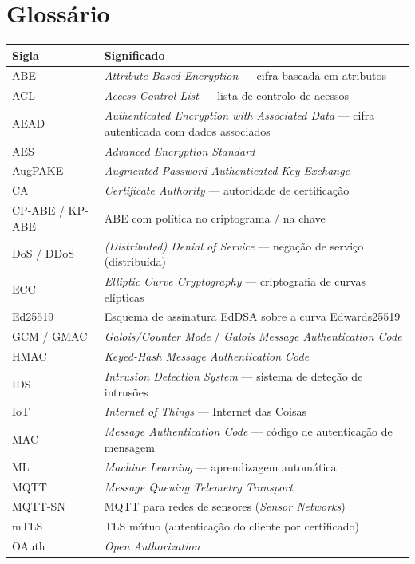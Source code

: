 \section*{Glossário}

\begin{longtable}{@{}L{2.6cm}L{12.2cm}@{}}
\toprule
\textbf{Sigla} & \textbf{Significado} \\
\midrule
\endhead
ABE    & \emph{Attribute-Based Encryption} --- cifra baseada em atributos \\
ACL    & \emph{Access Control List} --- lista de controlo de acessos \\
AEAD   & \emph{Authenticated Encryption with Associated Data} --- cifra autenticada com dados associados \\
AES    & \emph{Advanced Encryption Standard} \\
AugPAKE & \emph{Augmented Password-Authenticated Key Exchange} \\
CA     & \emph{Certificate Authority} --- autoridade de certificação \\
CP-ABE / KP-ABE & ABE com política no criptograma / na chave \\
DoS / DDoS & \emph{(Distributed) Denial of Service} --- negação de serviço (distribuída) \\
ECC    & \emph{Elliptic Curve Cryptography} --- criptografia de curvas elípticas \\
Ed25519 & Esquema de assinatura EdDSA sobre a curva Edwards25519 \\
GCM / GMAC & \emph{Galois/Counter Mode} / \emph{Galois Message Authentication Code} \\
HMAC   & \emph{Keyed-Hash Message Authentication Code} \\
IDS    & \emph{Intrusion Detection System} --- sistema de deteção de intrusões \\
IoT    & \emph{Internet of Things} --- Internet das Coisas \\
MAC    & \emph{Message Authentication Code} --- código de autenticação de mensagem \\
ML     & \emph{Machine Learning} --- aprendizagem automática \\
MQTT   & \emph{Message Queuing Telemetry Transport} \\
MQTT-SN & MQTT para redes de sensores (\emph{Sensor Networks}) \\
mTLS   & TLS mútuo (autenticação do cliente por certificado) \\
OAuth  & \emph{Open Authorization} \\

\end{longtable}
